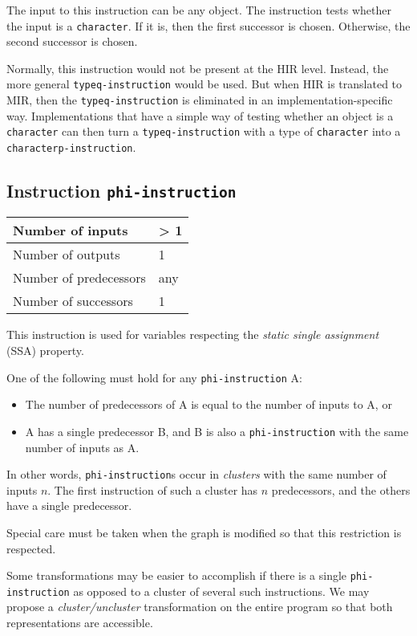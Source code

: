The input to this instruction can be any object.  The instruction
tests whether the input is a \texttt{character}.  If it is, then the
first successor is chosen.  Otherwise, the second successor is chosen.

Normally, this instruction would not be present at the HIR level.
Instead, the more general \texttt{typeq-instruction}
 would be used.  But when HIR is
translated to MIR, then the \texttt{typeq-instruction} is eliminated
in an implementation-specific way.  Implementations that have a simple
way of testing whether an object is a \texttt{character} can then turn
a \texttt{typeq-instruction} with a type of \texttt{character} into a
\texttt{characterp-instruction}.

\subsection{Instruction \texttt{phi-instruction}}
\label{hir-instruction-phi}

\begin{tabular}{|l|l|}
\hline
Number of inputs & > 1\\
\hline
Number of outputs & 1\\
\hline
Number of predecessors & any\\
\hline
Number of successors & 1\\
\hline
\end{tabular}

This instruction is used for variables respecting the \emph{static
  single assignment} (SSA) property.  

One of the following must hold for any \texttt{phi-instruction} A:

\begin{itemize}
\item The number of predecessors of A is equal to the number of inputs
  to A, or
\item A has a single predecessor B, and B is also a
  \texttt{phi-instruction} with the same number of inputs as A.
\end{itemize}

In other words, \texttt{phi-instruction}s occur in \emph{clusters}
with the same number of inputs $n$.  The first instruction of such a
cluster has $n$ predecessors, and the others have a single
predecessor. 

Special care must be taken when the graph is modified so that this
restriction is respected. 

Some transformations may be easier to accomplish if there is a single
\texttt{phi-instruction} as opposed to a cluster of several such
instructions.  We may propose a \emph{cluster/uncluster}
transformation on the entire program so that both representations are
accessible. 

